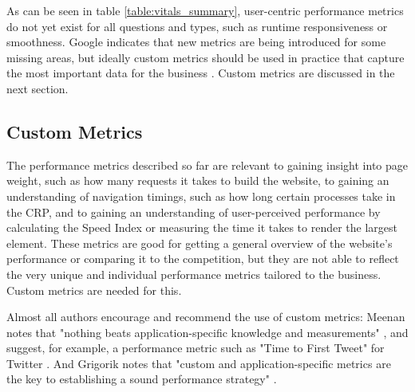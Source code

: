 As can be seen in table \ref{table:vitals_summary}, user-centric performance metrics do not yet exist for all questions and types, such as runtime responsiveness or smoothness.
Google indicates that new metrics are being introduced for some missing areas, but ideally custom metrics should be used in practice that capture the most important data for the business \cite{2019WaltonUserCentric}.
Custom metrics are discussed in the next section.




\subsection{Custom Metrics} %
\label{subsection:custom_metrics}


The performance metrics described so far are relevant to gaining insight into page weight, such as how many requests it takes to build the website, to gaining an understanding of navigation timings, such as how long certain processes take in the CRP, and to gaining an understanding of user-perceived performance by calculating the Speed Index or measuring the time it takes to render the largest element.
These metrics are good for getting a general overview of the website's performance or comparing it to the competition, but they are not able to reflect the very unique and individual performance metrics tailored to the business.
Custom metrics are needed for this.



Almost all authors encourage and recommend the use of custom metrics:
Meenan notes that "nothing beats application-specific knowledge and measurements" \cite{2013Meenan}, and suggest, for example, a performance metric such as "Time to First Tweet" for Twitter \cite{2021MeenanKadlec}.
And Grigorik notes that "custom and application-specific metrics are the key to establishing a sound performance strategy" \cite{2013Grigorik}.

